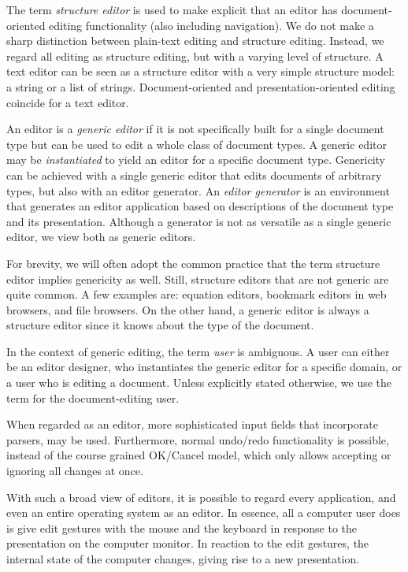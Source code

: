 The term {\em structure editor} is used to make explicit that an editor has document-oriented editing functionality (also including navigation). We do not make a sharp distinction between plain-text editing and structure editing. Instead, we regard all editing as structure editing, but with a varying level of structure. A text editor can be seen as a structure editor with a very simple structure model: a string or a list of strings. Document-oriented and presentation-oriented editing coincide for a text editor.

An editor is a {\em generic editor} if it is not specifically built for a single document type but can be used to edit a whole class of document types. A generic editor may be {\em instantiated} to yield an editor for a specific document type. Genericity can be achieved with a single generic editor that edits documents of arbitrary types, but also with an editor generator. An {\em editor generator} is an environment that generates an editor application based on descriptions of the document type and its presentation. Although a generator is not as versatile as a single generic editor, we view both as generic editors. 

For brevity, we will often adopt the common practice that the term structure editor implies genericity as well. Still, structure editors that are not generic are quite common. A few examples are: equation editors, bookmark editors in web browsers, and file browsers. On the other hand, a generic editor is always a structure editor since it knows about the type of the document.



In the context of generic editing, the term {\em user} is ambiguous. A user can either be an editor designer, who instantiates the generic editor for a specific domain, or a user who is editing a document. Unless explicitly stated otherwise, we use the term for the document-editing user.


\bc
When regarded as an editor, more sophisticated input fields that incorporate parsers, may be used. Furthermore, normal undo/redo functionality is possible, instead of the course grained OK/Cancel model, which only allows accepting or ignoring all changes at once.
\ec

\bc
With such a broad view of editors, it is possible to regard every application, and even an entire operating system as an editor. In essence, all a computer user does is give edit gestures with the mouse and the keyboard in response to the presentation on the computer monitor. In reaction to the edit gestures, the internal state of the computer changes, giving rise to a new presentation. 

